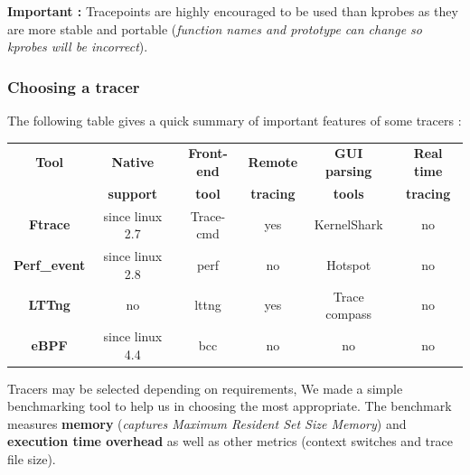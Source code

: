 \textbf{\color{orange}Important : } Tracepoints are highly encouraged to be used than kprobes as they are more stable and portable (\textit{function names and prototype can change so kprobes will be incorrect}).
\subsubsection{Choosing a tracer}
The following table gives a quick summary of important features of some tracers :
\begin{center}
	\begin{tabular}{|c|c|c|c|c|c|}
		\hline
			\rowcolor{LightCyan}
			\textbf{Tool} & \textbf{Native} & \textbf{Front-end} & \textbf{Remote} & \textbf{GUI parsing} & \textbf{Real time} \\	
						\rowcolor{LightCyan}   
			 & \textbf{support} & \textbf{tool} & \textbf{tracing} & \textbf{tools} & \textbf{tracing} \\	 		
   		\hline
	    	\textbf{Ftrace} & since linux 2.7 & Trace-cmd & yes & KernelShark & no \\
	    \hline
	    	\textbf{Perf\_event} & since linux 2.8 & perf & no & Hotspot & no \\
		\hline     
        	\textbf{LTTng} & no & lttng & yes & Trace compass & no \\
		\hline     
        	\textbf{eBPF} & since linux 4.4 & bcc & no & no & no \\
   		\hline
	\end{tabular}
\end{center}

Tracers may be selected depending on requirements, We made a simple benchmarking tool to help us in choosing the most appropriate. The benchmark measures \textbf{memory} (\textit{captures Maximum Resident Set Size Memory}) and \textbf{execution time overhead} as well as other metrics (context switches and trace file size).

\begin{center}
\end{center}


